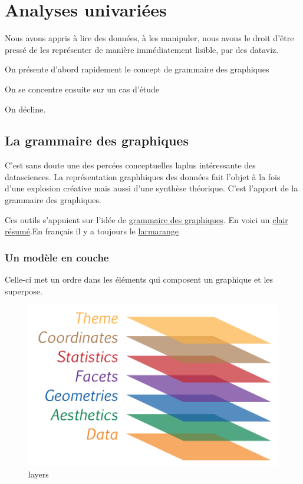 \documentclass[
]{book}
\begin{document}
\hypertarget{analyses-univariuxe9es}{%
\chapter{Analyses univariées}\label{analyses-univariuxe9es}}

Nous avons appris à lire des données, à les manipuler, nous avons le droit d'être pressé de les représenter de manière immédiatement lisible, par des dataviz.

On présente d'abord rapidement le concept de grammaire des graphiques

On se concentre ensuite sur un cas d'étude

On décline.

\hypertarget{la-grammaire-des-graphiques}{%
\section{La grammaire des graphiques}\label{la-grammaire-des-graphiques}}

C'est sans doute une des percées conceptuelles laplus intéressante des datasciences. La représentation graphhiques des données fait l'objet à la fois d'une explosion créative mais aussi d'une synthèse théorique. C'est l'apport de la grammaire des graphiques.

Ces outils s'appuient sur l'idée de \href{https://www.goodreads.com/book/show/2549408.The_Grammar_of_Graphics}{grammaire des graphiques}. En voici un \href{https://cfss.uchicago.edu/notes/grammar-of-graphics/}{clair résumé}.En français il y a toujours le \href{http://larmarange.github.io/analyse-R/intro-ggplot2.html}{larmarange}

\hypertarget{un-moduxe8le-en-couche}{%
\subsection{Un modèle en couche}\label{un-moduxe8le-en-couche}}

Celle-ci met un ordre dans les éléments qui composent un graphique et les superpose.

\begin{figure}
\centering
\includegraphics{./Images/graphiclayers.png}
\caption{layers}
\end{figure}
\end{document}
